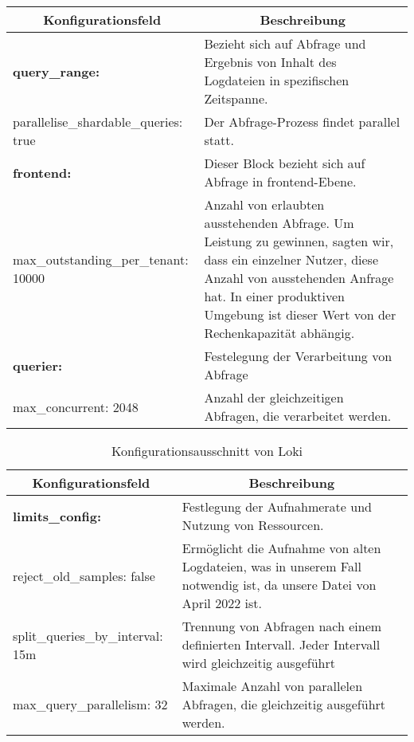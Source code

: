 \begin{table}[H]
  \begin{tabularx}{\textwidth}{|m{6cm}|X|}
  \hline
  \multicolumn{1}{|c|}{\textbf{Konfigurationsfeld}} & \multicolumn{1}{|c|}{\textbf{Beschreibung}} \\
  \hline
  \textbf{query\_range:} & Bezieht sich auf Abfrage und Ergebnis von Inhalt des Logdateien in spezifischen Zeitspanne. \\
  \hphantom{te}parallelise\_shardable\_queries: true & Der Abfrage-Prozess findet parallel statt.\\ \hline

  \textbf{frontend:} & Dieser Block bezieht sich auf Abfrage in \gls{frontend}-Ebene. \\
  \hphantom{te}max\_outstanding\_per\_tenant: 10000 & Anzahl von erlaubten  ausstehenden Abfrage. Um Leistung zu gewinnen, sagten wir, dass ein einzelner Nutzer, diese Anzahl von ausstehenden Anfrage hat. In einer produktiven Umgebung ist dieser Wert von der Rechenkapazität abhängig.\\ \hline

  \textbf{querier:} & Festelegung der Verarbeitung von Abfrage \\ 
  \hphantom{te}max\_concurrent: 2048 & Anzahl der gleichzeitigen Abfragen, die verarbeitet werden. \\ \hline

  \end{tabularx}
\end{table}

\begin{table}[H]
  \begin{tabularx}{\textwidth}{|m{6cm}|X|}
  \hline
  \multicolumn{1}{|c|}{\textbf{Konfigurationsfeld}} & \multicolumn{1}{|c|}{\textbf{Beschreibung}} \\
  \hline

  \textbf{limits\_config:} & Festlegung der Aufnahmerate und Nutzung von Ressourcen. \\ 
  \hphantom{te}reject\_old\_samples: false & Ermöglicht die Aufnahme von alten Logdateien, was in unserem Fall notwendig ist, da unsere Datei von April 2022 ist. \\ 
  \hphantom{te}split\_queries\_by\_interval: 15m & Trennung von Abfragen nach einem definierten Intervall. Jeder Intervall wird gleichzeitig ausgeführt \\ 
  \hphantom{te}max\_query\_parallelism: 32 & Maximale Anzahl von parallelen Abfragen, die gleichzeitig ausgeführt werden.  \\ \hline
  
  \end{tabularx}
  \caption[Konfigurationsausschnitt von Loki]
  {Konfigurationsausschnitt von Loki}
  \label{tab:KonfigLoki}
\end{table}


